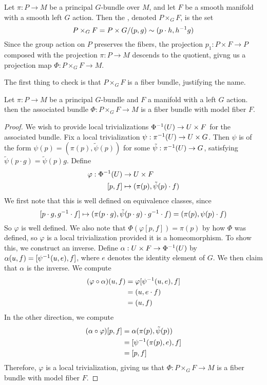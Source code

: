 %
\begin{defn}
Let $\pi : P \to M$ be a principal $G$-bundle over $M$, and let $F$ be a
smooth manifold with a smooth left $G$ action. Then the , denoted $P \times_G F$, is the set
\[
P \times_G F = P \times G / (p,g) \sim (p\cdot h, h^{-1} g)
\]
Since the group action on $P$ preserves the fibers, the projection
$p_1 : P \times F \to P$ composed with the projection $\pi : P \to M$
descends to the quotient, givng us a projection map
$\Phi : P \times_G F \to M$.
\end{defn}
%
The first thing to check is that $P \times_G F$ is a fiber bundle, justifying
the name.
%
\begin{prop}
Let $\pi : P \to M$ be a principal $G$-bundle and $F$ a manifold with a left $G$ action.
then the associated bundle $ \Phi : P \times_G F \to M$ is a fiber bundle with
model fiber $F$.
\end{prop}
%
\begin{proof}
We wish to provide local trivializations  $\Phi^{-1}(U) \to U \times F$ for the
associated bundle. Fix a local trivialization  $\psi : \pi^{-1}(U) \to U \times G$.
Then $\psi$ is of the form $\psi(p) = (\pi(p), \tilde{\psi}(p))$ for some
$\tilde{\psi} : \pi^{-1}(U) \to G$, satisfying $\tilde{\psi}(p\cdot g) = \tilde{\psi}(p)g$.
Define
\begin{align*}
\varphi : \Phi^{-1}(U) &\to U \times F \\
[p,f] &\mapsto (\pi(p), \tilde{\psi}(p)\cdot f)
\end{align*}
We first note that this is well defined on equivalence classes, since
\[
[p\cdot g, g^{-1} \cdot f] \mapsto (\pi(p \cdot g), \tilde{\psi}(p \cdot g)
\cdot g^{-1} \cdot f)
= (\pi(p), \psi(p)\cdot f)
\]
So $\varphi$ is well defined. We also note that $\Phi(\varphi[p,f]) = \pi(p)$
by how $\Phi$ was defined, so $\varphi$ is a local trivialization provided
it is a homeomorphism. To show this, we construct an inverse.
Define $\alpha : U \times F \to \Phi^{-1}(U)$
by $\alpha(u,f) = [\psi^{-1}(u,e), f]$, where $e$ denotes the identity element
of $G$. We then claim that $\alpha$ is the inverse. We compute
%
\begin{align*}
(\varphi \circ \alpha)(u,f) &= \varphi[\psi^{-1}(u,e),f] \\
&= (u, e\cdot f)\\
&= (u,f)
\end{align*}
%
In the other direction, we compute
%
\begin{align*}
(\alpha \circ \varphi)[p,f] &= \alpha(\pi(p), \tilde{\psi}(p)) \\
&= [\psi^{-1}(\pi(p), e), f] \\
&= [p, f]
\end{align*}
%
Therefore, $\varphi$ is a local trivialization, giving us that
$\Phi: P \times_G F \to M$ is a fiber bundle with model fiber $F$.
%
\end{proof}
